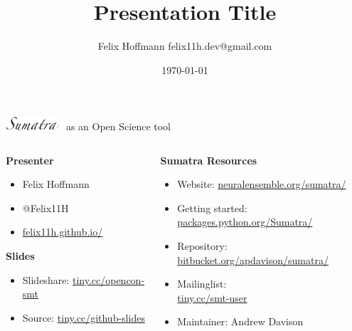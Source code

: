 \documentclass[xcolor=svgnames,11pt]{beamer}
\title {Presentation Title}
\author[Felix Hoffmann]{%
  Felix Hoffmann \vspace{0.25cm} \newline %
  \small felix11h.dev@gmail.com %
}
\institute[]{}
\date{\today}
\begin{document}



\begin{frame}
  \begin{center} 

    \Large \includegraphics[width=2.0cm]{sumatra_logo_up.png} \textcolor{white}{-}as an
    Open Science tool
      \end{center}
      \vspace{0.35cm}

    \begin{columns}[t]
      \begin{column}{0.4\textwidth}        
        \textbf{Presenter}
        \normalsize
        \vspace{0.18cm}
        \begin{itemize}[leftmargin=0.6cm]
          \item[] Felix Hoffmann
          \item[] @Felix11H
          \item[] \href{http://felix11h.github.io/}{felix11h.github.io/}
        \end{itemize}

        \vspace{0.38cm}
        \textbf{Slides}
        \normalsize
        \vspace{0.18cm}
        \begin{itemize}[leftmargin=0.6cm]
          \item[] Slideshare: \href{http://tiny.cc/opencon-smt}{tiny.cc/opencon-smt}
          \item[] Source: \href{http://tiny.cc/github-slides}{tiny.cc/github-slides}
        \end{itemize}


\end{column}
\begin{column}{0.64\textwidth}
  \textbf{Sumatra Resources}
  \vspace{0.28cm}
    \normalsize 
    \begin{itemize}[leftmargin=0.6cm]
      \item[] Website:
    \href{http://neuralensemble.org/sumatra/}{neuralensemble.org/sumatra/}\\
    \item[]Getting started: \href{http://packages.python.org/Sumatra/}{packages.python.org/Sumatra/}\\
    \item[]Repository:
    \href{http://bitbucket.org/apdavison/sumatra/}{bitbucket.org/apdavison/sumatra/}
    \item[] Mailinglist: \\\href{http://tiny.cc/smt-user}{tiny.cc/smt-user}
    \item[] Maintainer: Andrew Davison 



\end{itemize}
\end{column}
\end{columns}
\end{frame}
\end{document}
